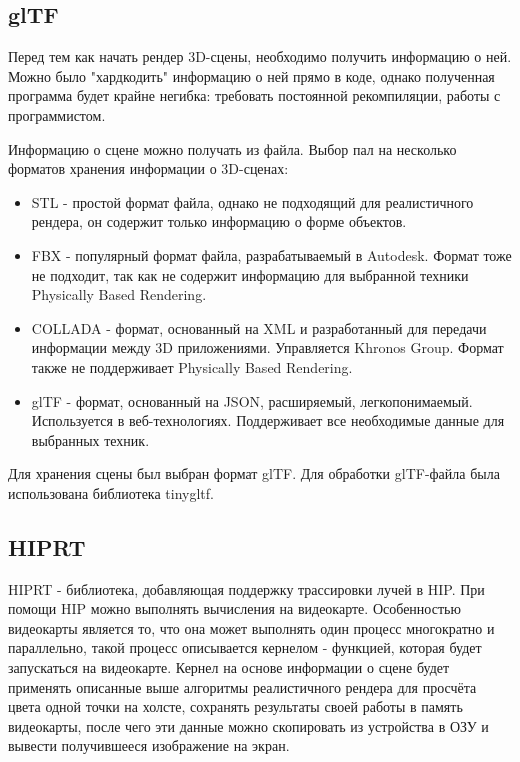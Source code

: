 \documentclass[a4paper,14pt]{extarticle}
\begin{document}
\subsection{glTF}
Перед тем как начать рендер 3D-сцены, необходимо получить информацию о ней.
Можно было "хардкодить" информацию о ней прямо в коде, однако полученная программа 
будет крайне негибка: требовать постоянной рекомпиляции, работы с программистом.

Информацию о сцене можно получать из файла. Выбор пал на несколько форматов хранения информации о 3D-сценах:
\begin{itemize}
    \item STL - простой формат файла, однако не подходящий для реалистичного рендера, он содержит только информацию о форме объектов.
    \item FBX - популярный формат файла, разрабатываемый в Autodesk. Формат тоже не подходит, 
    так как не содержит информацию для выбранной техники Physically Based Rendering.
    \item COLLADA - формат, основанный на XML и разработанный для передачи информации между 3D приложениями. Управляется Khronos Group. 
    Формат также не поддерживает Physically Based Rendering.
    \item glTF - формат, основанный на JSON, расширяемый, легкопонимаемый. Используется в веб-технологиях. 
    Поддерживает все необходимые данные для выбранных техник. 
\end{itemize}

Для хранения сцены был выбран формат glTF. Для обработки glTF-файла была использована библиотека tinygltf. 
\subsection{HIPRT}
HIPRT - библиотека, добавляющая поддержку трассировки лучей в HIP. 
При помощи HIP можно выполнять вычисления на видеокарте.
Особенностью видеокарты является то, что она может выполнять один процесс многократно и параллельно, 
такой процесс описывается кернелом - функцией, которая будет запускаться на видеокарте. Кернел на основе информации о сцене 
будет применять описанные выше алгоритмы реалистичного рендера для просчёта цвета одной точки на холсте, 
сохранять результаты своей работы в память видеокарты, после чего эти данные можно скопировать из устройства в ОЗУ 
и вывести получившееся изображение на экран.
\end{document}
